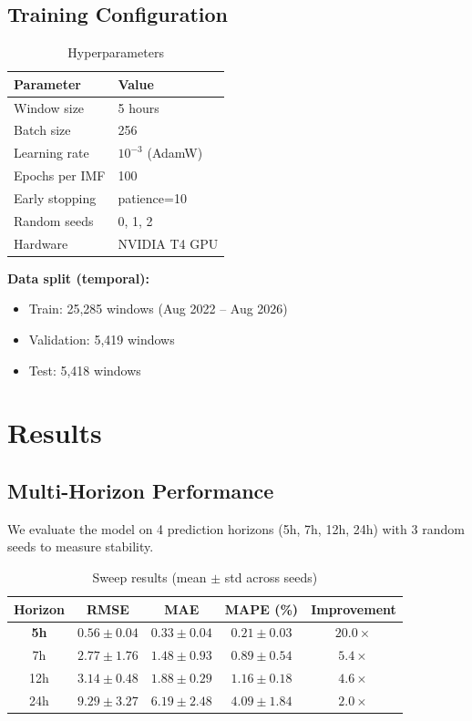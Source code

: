 \documentclass[11pt,a4paper]{article}
\begin{document}
\subsection{Training Configuration}

\begin{table}[h]
\centering
\caption{Hyperparameters}
\begin{tabular}{ll}
\toprule
\textbf{Parameter} & \textbf{Value} \\
\midrule
Window size & 5 hours \\
Batch size & 256 \\
Learning rate & $10^{-3}$ (AdamW) \\
Epochs per IMF & 100 \\
Early stopping & patience=10 \\
Random seeds & 0, 1, 2 \\
Hardware & NVIDIA T4 GPU \\
\bottomrule
\end{tabular}
\end{table}

\textbf{Data split (temporal):}
\begin{itemize}
    \item Train: 25,285 windows (Aug 2022 -- Aug 2026)
    \item Validation: 5,419 windows
    \item Test: 5,418 windows
\end{itemize}

\section{Results}

\subsection{Multi-Horizon Performance}

We evaluate the model on 4 prediction horizons (5h, 7h, 12h, 24h) with 3 random seeds to measure stability.

\begin{table}[h]
\centering
\caption{Sweep results (mean $\pm$ std across seeds)}
\begin{tabular}{ccccc}
\toprule
\textbf{Horizon} & \textbf{RMSE} & \textbf{MAE} & \textbf{MAPE (\%)} & \textbf{Improvement} \\
\midrule
\textbf{5h} & $0.56 \pm 0.04$ & $0.33 \pm 0.04$ & $0.21 \pm 0.03$ & $\mathbf{20.0\times}$ \\
7h & $2.77 \pm 1.76$ & $1.48 \pm 0.93$ & $0.89 \pm 0.54$ & $5.4\times$ \\
12h & $3.14 \pm 0.48$ & $1.88 \pm 0.29$ & $1.16 \pm 0.18$ & $4.6\times$ \\
24h & $9.29 \pm 3.27$ & $6.19 \pm 2.48$ & $4.09 \pm 1.84$ & $2.0\times$ \\
\bottomrule
\end{tabular}
\end{table}
\end{document}
